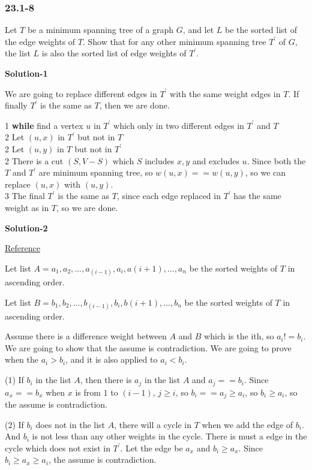 \subsubsection {23.1-8}

Let $T$ be a minimum spanning tree of a graph $G$, and let $L$ be the sorted
list of the edge weights of $T$. Show that for any other minimum spanning tree
$T^{'}$ of $G$, the list $L$ is also the sorted list of edge weights of $T^{'}$.

\textbf{Solution-1}

We are going to replace different edges in $T^{'}$ with the same weight edges
in $T$. If finally $T^{'}$ is the same as $T$, then we are done.

1 \space \textbf{while} find a vertex $u$ in $T^{'}$ which only in two different
edges in $T^{'}$ and $T$ \\
2 \space \space \space Let $(u, x)$ in $T^{'}$ but not in $T$ \\
2 \space \space \space Let $(u, y)$ in $T$ but not in $T^{'}$ \\
2 \space \space \space There is a cut $(S, V - S)$ which $S$ includes $x, y$ and
excludes $u$. Since both the $T$ and $T^{'}$ are minimum spanning tree, so
$w(u, x) == w(u, y)$, so we can replace $(u, x)$ with $(u, y)$.\\
3 \space The final $T^{'}$ is the same as $T$, since each edge replaced in $T^{'}$
has the same weight as in $T$, so we are done.

\textbf{Solution-2}

\href{https://github.com/gzc/CLRS/}{Reference}

Let list $A = { a_1, a_2, ... , a_(i-1), a_i, a(i+1), ..., a_n }$ be the sorted
weights of $T$ in ascending order.

Let list $B = { b_1, b_2, ... , b_(i-1), b_i, b(i+1), ..., b_n }$ be the sorted
weights of $T$ in ascending order.

Assume there is a difference weight between $A$ and $B$ which is the ith, so
$a_i != b_i$. We are going to show that the assume is contradiction. We are
going to prove when the $a_i > b_i$, and it is also applied to $a_i < b_i$.

(1) If $b_i$ in the list $A$, then there is $a_j$ in the list $A$ and
$a_j == b_i$. Since $a_x == b_x$ when $x$ is from $1$ to $(i - 1)$, $j \geq i$,
so $b_i == a_j \geq a_i$, so $b_i \geq a_i$, so the assume is contradiction.

(2) If $b_i$ does not in the list $A$, there will a cycle in $T$ when we add
the edge of $b_i$. And $b_i$ is not less than any other weights in the cycle.
There is must a edge in the cycle which does not exist in $T^{'}$. Let the edge
be $a_x$ and $b_i \geq a_x$. Since $b_i \geq a_x \geq a_i$, the assume is
contradiction.

